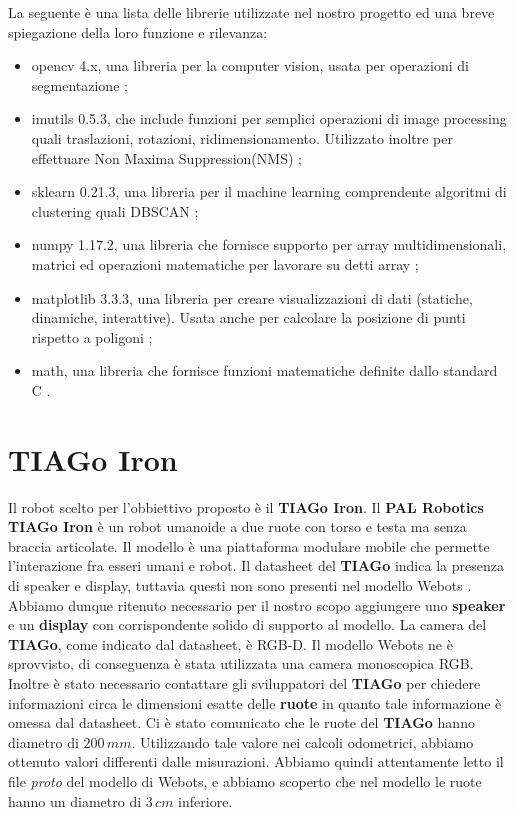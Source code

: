 \documentclass[a4paper]{article}
\begin{document}
	La seguente è una lista delle librerie utilizzate nel nostro progetto ed una breve spiegazione della loro funzione e rilevanza:

	\begin{itemize}
		\item opencv 4.x, una libreria per la computer vision, usata per
			operazioni di segmentazione \cite{opencv};
		\item imutils 0.5.3, che include funzioni per semplici operazioni di image
			processing quali traslazioni, rotazioni, ridimensionamento.
			Utilizzato inoltre per effettuare Non Maxima Suppression(NMS)
			\cite{imutils};
		\item sklearn 0.21.3, una libreria per il machine learning comprendente
			algoritmi di clustering quali DBSCAN \cite{scikit};
		\item numpy 1.17.2, una libreria che fornisce supporto per array
			multidimensionali, matrici ed operazioni matematiche per lavorare
			su detti array \cite{numpy};
		\item matplotlib 3.3.3, una libreria per creare visualizzazioni di dati
			(statiche, dinamiche, interattive). Usata anche per calcolare la
			posizione di punti rispetto a poligoni \cite{matplotlib}; 
		\item math, una libreria che fornisce funzioni matematiche definite dallo
			standard C \cite{math}.
	\end{itemize}


	\section{TIAGo Iron}\label{sec:TIAGo-Iron} 
	Il robot scelto per l'obbiettivo proposto è il \textbf{TIAGo Iron}. \newline Il \textbf{PAL Robotics TIAGo Iron} \cite{pages2016tiago} è un robot umanoide a due ruote con torso e testa ma senza braccia articolate. Il modello è una piattaforma modulare mobile che permette l'interazione fra esseri umani e robot. \newline
	Il datasheet del \textbf{TIAGo} \cite{tiago_datasheet} indica la presenza di speaker e display, tuttavia questi non sono presenti nel modello Webots \cite{tiagoiron}. Abbiamo dunque ritenuto necessario per il nostro scopo aggiungere uno \textbf{speaker} e un \textbf{display} con corrispondente solido di supporto al modello.
	La camera del \textbf{TIAGo}, come indicato dal datasheet, è RGB-D. Il modello Webots ne è sprovvisto, di conseguenza è stata utilizzata una camera monoscopica RGB.
	Inoltre è stato necessario contattare gli sviluppatori del \textbf{TIAGo} per chiedere informazioni circa le dimensioni esatte delle \textbf{ruote} in quanto tale informazione è omessa dal datasheet. Ci è stato comunicato che le ruote del \textbf{TIAGo} hanno diametro di $200\,mm$. Utilizzando tale valore nei calcoli odometrici, abbiamo ottenuto valori differenti dalle misurazioni. Abbiamo quindi attentamente letto il file \textit{proto} del modello di Webots, e abbiamo scoperto che nel modello le ruote hanno un diametro di $3\,cm$ inferiore. 
	
\end{document}
